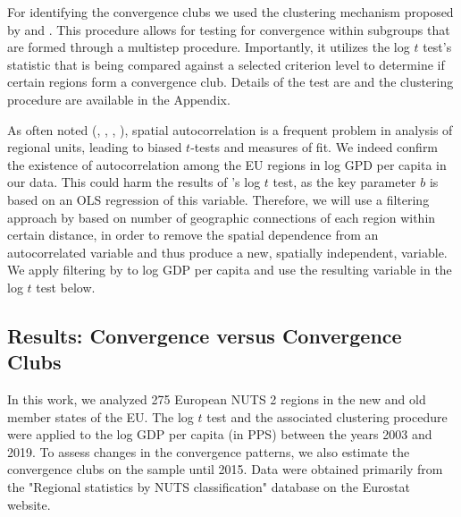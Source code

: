 \documentclass[11pt]{article}
\begin{document}
For identifying the convergence clubs we used the clustering mechanism proposed by \citet{phillips2009economic} and \citet{bartkowska2012regional}. This procedure allows for testing for convergence within subgroups that are formed through a multistep procedure. Importantly, it utilizes the log $t$ test's statistic that is being compared against a selected criterion level to determine if certain regions form a convergence club. Details of the test are and the clustering procedure are available in the Appendix.

As often noted (\citet{dall2008regional}, \citet{magrini2004regional}, \citet{anselin1991properties}, \citet{anselin2001spatial}), spatial autocorrelation is a frequent problem in analysis of regional units, leading to biased $t$-tests and measures of fit. We indeed confirm the existence of autocorrelation among the EU regions in log GPD per capita in our data. This could harm the results of \citeauthor{phillips2007transition}'s log $t$ test, as the key parameter $b$ is based on an OLS regression of this variable. Therefore, we will use a filtering approach by \cite{getis2002comparative} based on number of geographic connections of each region within certain distance, in order  to remove the spatial dependence from an autocorrelated variable and thus produce a new, spatially independent, variable. We apply filtering by \cite{getis2002comparative} to log GDP per capita and use the resulting variable in the log $t$ test below.



\subsection{Results: Convergence versus Convergence Clubs}
In this work, we analyzed 275 European NUTS 2 regions in the new and old member states of the EU. The log $t$ test and the associated clustering procedure were applied to the log GDP per capita (in PPS) between the years 2003 and 2019. To assess changes in the convergence patterns, we also estimate the convergence clubs on the sample until 2015. Data were obtained primarily from the "Regional statistics by NUTS classification" database on the Eurostat website.

\end{document}

